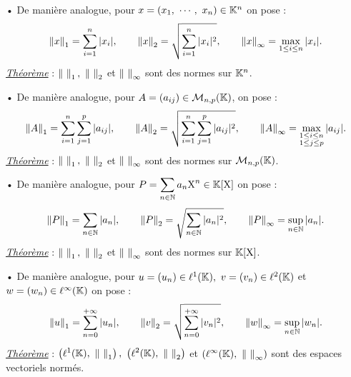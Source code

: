 \vspace{1cm}

• De manière analogue, pour \(x=(x_1,\ \cdots,\ x_n)\in \KK ^n\) on pose :\vspace{-0.2cm}
\[\left\lVert x\right\rVert_1 = \sum_{i=1}^n |x_i|, \qquad \left\lVert x\right\rVert_2 = \sqrt{\sum_{i=1}^n |x_i|^2}, \qquad \left\lVert x\right\rVert_{\infty} = \max _{1\leq i\leq n} |x_i|. \]
\underline{\emph{Théorème}} : \(\left\lVert\ \right\rVert_1,\ \left\lVert\ \right\rVert_2\) et \(\left\lVert\ \right\rVert_{\infty}\) sont des normes sur \(\mathbb{K} ^n\).

\vspace{1cm}

• De manière analogue, pour \(A=(a_{ij})\in \mathcal{M}_{n,p}(\mathbb{K})\), on pose :\vspace{-0.2cm}
\[\left\lVert A\right\rVert_1= \sum_{i=1}^n\sum_{j=1}^p |a_{ij}|, \qquad \left\lVert A\right\rVert_2= \sqrt{\sum_{i=1}^n\sum_{j=1}^p |a_{ij}|^2}, \qquad \left\lVert A\right\rVert_\infty = \max _{\substack{1\leq i\leq n \\ 1\leq j\leq p}} |a_{ij}|. \]
\underline{\emph{Théorème}} : \(\left\lVert\ \right\rVert_1,\ \left\lVert\ \right\rVert_2\) et \(\left\lVert\ \right\rVert_{\infty}\) sont des normes sur \(\mathcal{M}_{n,p}(\mathbb{K})\).

\vspace{1cm}

• De manière analogue, pour \(\displaystyle P=\sum_{n\in \mathbb{N}} a_n\text{X}^n \in \mathbb{K}[\text{X}] \) on pose :\vspace{-0.2cm}
\[\left\lVert P\right\rVert_1 = \sum_{n\in \mathbb{N}} |a_n|, \qquad \left\lVert P\right\rVert_2 = \sqrt{\sum_{n\in \mathbb{N}} |a_n|^2}, \qquad \left\lVert P\right\rVert_{\infty} = \sup _{n\in \mathbb{N}} |a_n|. \]
\underline{\emph{Théorème}} : \(\left\lVert\ \right\rVert_1,\ \left\lVert\ \right\rVert_2\) et \(\left\lVert\ \right\rVert_{\infty}\) sont des normes sur \(\mathbb{K}[\text{X}]\).

\vspace{1cm}

• De manière analogue, pour \(u=(u_n)\in \ell^1(\mathbb{K}),\ v=(v_n)\in \ell^2(\mathbb{K})\) et \(w=(w_n)\in \ell^\infty(\mathbb{K})\) on pose :\vspace{-0.2cm}
\[\left\lVert u\right\rVert_1 = \sum_{n=0}^{+\infty} |u_n|, \qquad \left\lVert v\right\rVert_2 = \sqrt{\sum_{n=0}^{+\infty} |v_n|^2}, \qquad \left\lVert w\right\rVert_{\infty} = \sup _{n\in \mathbb{N}} |w_n|. \]
\underline{\emph{Théorème}} : \(\displaystyle \left( \ell^1(\KK),\ \norm{\ }_1 \right) ,\ \left( \ell^2(\KK),\ \norm{\ }_2 \right) \) et \(\displaystyle \left( \ell^\infty(\mathbb{K}),\ \left\lVert\ \right\rVert_\infty \right) \) sont des espaces vectoriels normés.

\vspace{1cm}

